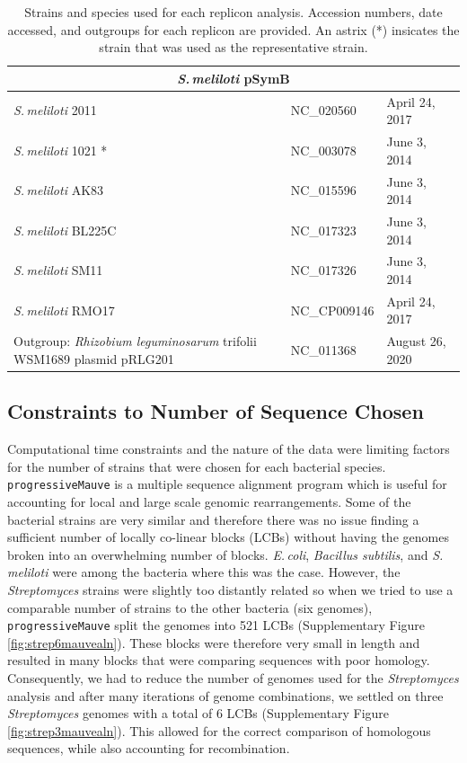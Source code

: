 \documentclass[11pt]{article}
\newcommand{\smel}{\textit{S.\,meliloti}\xspace}
\newcommand{\agrot}{\textit{Agrobacterium tumefaciens}\xspace}
\newcommand{\strep}{\textit{Streptomyces}\xspace}
\newcommand{\ecol}{\textit{E.\,coli}\xspace}
\newcommand{\bas}{\textit{Bacillus subtilis}\xspace}
\newcommand{\p}{\texttt{progressiveMauve}\xspace}
\newcommand{\rleg}{\textit{Rhizobium leguminosarum}\xspace}
\begin{document}
\begin{table}[H]
{\begin{minipage}{\textwidth}
\begin{tabular}{lll}
				\midrule
				\multicolumn{3}{c}{\smel pSymB} \\
				\midrule
				\smel 2011 & NC\_020560 & April 24, 2017\\
				\smel 1021 * & NC\_003078 & June 3, 2014\\
				\smel AK83 & NC\_015596 & June 3, 2014\\
				\smel BL225C & NC\_017323 & June 3, 2014\\
				\smel SM11 & NC\_017326 & June 3, 2014\\
				\smel RMO17 & NC\_CP009146 & April 24, 2017\\
				Outgroup: \rleg trifolii WSM1689 plasmid pRLG201 & NC\_011368 & August 26, 2020\\
		
				\bottomrule
				
				
			\end{tabular}
			\caption{\label{tab:seqdata} Strains and species used for each replicon analysis. Accession numbers, date accessed, and outgroups for each replicon are provided. An astrix (*) insicates the strain that was used as the representative strain.}
		\end{minipage}}
	\end{table}	

\subsection{Constraints to Number of Sequence Chosen}
Computational time constraints and the nature of the data were limiting factors for the number of strains that were chosen for each bacterial species.
\p is a multiple sequence alignment program which is useful for accounting for local and large scale genomic rearrangements. 
Some of the bacterial strains are very similar and therefore there was no issue finding a sufficient number of locally co-linear blocks (LCBs) without having the genomes broken into an overwhelming number of blocks.
\ecol, \bas, and \smel were among the bacteria where this was the case.
However, the \strep strains were slightly too distantly related so when we tried to use a comparable number of strains to the other bacteria (six genomes), \p split the genomes into 521 LCBs (Supplementary Figure \ref{fig:strep6mauvealn}).
These blocks were therefore very small in length and resulted in many blocks that were comparing sequences with poor homology.
Consequently, we had to reduce the number of genomes used for the \strep analysis and after many iterations of genome combinations, we settled on three \strep genomes with a total of 6 LCBs (Supplementary Figure \ref{fig:strep3mauvealn}).
This allowed for the correct comparison of homologous sequences, while also accounting for recombination.
\end{document}
